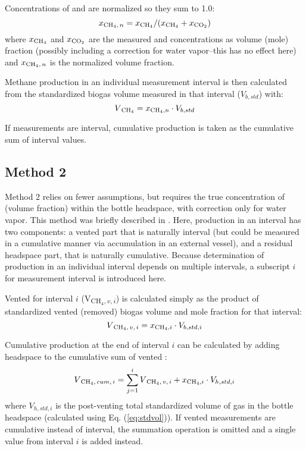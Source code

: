 \documentclass[]{article}
\begin{document}
Concentrations of  and  are normalized so they sum to 1.0:
\begin{equation}
  x\textsubscript{CH$_4$$, n$} = x\textsubscript{CH$_4$}/(x\textsubscript{CH$_4$} + x\textsubscript{CO$_2$})
\end{equation}
where $x\textsubscript{CH$_4$}$ and $x\textsubscript{CO$_2$}$ are the measured  and  concentrations as volume (mole) fraction (possibly including a correction for water vapor--this has no effect here) and $x\textsubscript{CH$_4$$, n$}$ is the normalized  volume fraction.

Methane production in an individual measurement interval is then calculated from the standardized biogas volume measured in that interval ($V_{b,std}$) with:
\begin{equation}
  V\textsubscript{CH$_4$} = x\textsubscript{CH$_4$,$ n$} \cdot V_{b, std}
\end{equation}

If measurements are interval, cumulative  production is taken as the cumulative sum of interval values.

\subsection{Method 2}
Method 2 relies on fewer assumptions, but requires the true concentration of  (volume fraction) within the bottle headspace, with correction only for water vapor.
This method was briefly described in \citet[p 488]{owenBioassayMonitoringBiochemical1979}.
Here,  production in an interval has two components: a vented part that is naturally interval (but could be measured in a cumulative manner via accumulation in an external vessel), and a residual headspace part, that is naturally cumulative.
Because determination of  production in an individual interval depends on multiple intervals, a subscript $i$ for measurement interval is introduced here.

Vented  for interval $i$ (V\textsubscript{CH$_4, v, i$}) is calculated simply as the product of standardized vented (removed) biogas volume and  mole fraction for that interval:
\begin{equation}
  V\textsubscript{CH$_4$$,v, i$} = x\textsubscript{CH$_4$,$ i$} \cdot V_{b, std, i}
\end{equation}

Cumulative  production at the end of interval $i$ can be calculated by adding headspace  to the cumulative sum of vented :
\begin{equation}
  V\textsubscript{CH$_4$$, cum, i$} = \sum_{j = 1}^i {V\textsubscript{CH$_4$$, v, i$}} +  x\textsubscript{CH$_4$,$ i$} \cdot V_{h, std, i}
\end{equation}
where $V_{h, std, i}$ is the post-venting total standardized volume of gas in the bottle headspace (calculated using Eq. (\ref{eq:stdvol})).
If vented measurements are cumulative instead of interval, the summation operation is omitted and a single value from interval $i$ is added instead.


\end{document}
